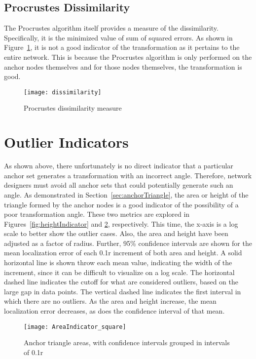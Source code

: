 \subsection{Procrustes Dissimilarity}

The Procrustes algorithm itself provides a measure of the dissimilarity.  Specifically, it is the minimized value of sum of squared errors\cite{procrustes-matlab}.  As shown in Figure~\ref{fig:dissimilarity}, it is not a good indicator of the transformation as it pertains to the entire network.  This is because the Procrustes algorithm is only performed on the anchor nodes themselves and for those nodes themselves, the transformation is good.

\begin{figure}
  \centering
	\texttt{[image: dissimilarity]}
	\caption{Procrustes dissimilarity measure}	
	\label{fig:dissimilarity}
\end{figure}

\section{Outlier Indicators} 
\label{sec:outlierindicators}
As shown above, there unfortunately is no direct indicator that a particular anchor set generates a transformation with an incorrect angle.  Therefore, network designers must avoid all anchor sets that could potentially generate such an angle.  As demonstrated in Section~\ref{sec:anchorTriangle}, the area or height of the triangle formed by the anchor nodes is a good indicator of the possibility of a poor transformation angle.  These two metrics are explored in Figures~\ref{fig:heightIndicator} and \ref{fig:areaIndicator}, respectively.  This time, the x-axis is a log scale to better show the outlier cases. Also, the area and height have been adjusted as a factor of radius. Further, 95\% confidence intervals are shown for the mean localization error of each 0.1r increment of both area and height.  A solid horizontal line is shown throw each mean value, indicating the width of the increment, since it can be difficult to visualize on a log scale.  The horizontal dashed line indicates the cutoff for what are considered outliers, based on the large gap in data points.  The vertical dashed line indicates the first interval in which there are no outliers.  As the area and height increase, the mean localization error decreases, as does the confidence interval of that mean.  

\begin{figure}
  \centering
	\texttt{[image: AreaIndicator\_square]}
	\caption[Anchor triangle areas]{Anchor triangle areas, with confidence intervals grouped in intervals of 0.1r}	
	\label{fig:areaIndicator}
\end{figure}

